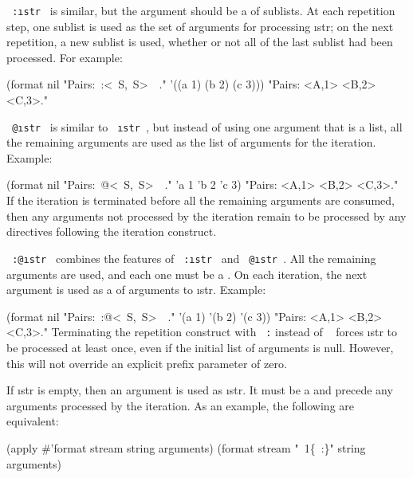 {\tt ~:\lbr \i{str}~\rbr  } is similar, 
but the argument should be a  of sublists.
At each repetition step, one sublist 
is used as the set of arguments for
processing \i{str}; on the next repetition, a new sublist 
is used, whether
or not all of the last sublist had been processed.  
For example:

                                                                               

\code
 (format nil "Pairs:~:\lbr <~S,~S>~\rbr\ ." 
                 '((a 1) (b 2) (c 3)))
\EV "Pairs: <A,1> <B,2> <C,3>."
\endcode

{\tt ~@\lbr \i{str}~\rbr }
is similar to {\tt ~\lbr \i{str}~\rbr  }, but instead of
using one argument that is a list, all the remaining arguments
are used as the list of arguments for the iteration.
Example:
                                    
\code
 (format nil "Pairs:~@\lbr <~S,~S>~\rbr\ ." 'a 1 'b 2 'c 3)
\EV "Pairs: <A,1> <B,2> <C,3>."
\endcode
If the iteration is terminated before all the remaining arguments are
consumed, then any arguments not processed by the iteration remain to be
processed by any directives following the iteration construct.

{\tt ~:@\lbr \i{str}~\rbr  } 
combines the features                              
of {\tt ~:\lbr \i{str}~\rbr  }
and {\tt ~@\lbr \i{str}~\rbr  }.
All the remaining arguments
are used, and each one must be a .
On each iteration, the next argument is 
used as a  of arguments to \i{str}.
Example:
                                     
\code
 (format nil "Pairs:~:@\lbr <~S,~S>~\rbr\ ." 
              '(a 1) '(b 2) '(c 3)) 
\EV "Pairs: <A,1> <B,2> <C,3>."
\endcode
Terminating the repetition construct with {\tt ~:\rbr } 
instead of {\tt ~\rbr  }
forces \i{str} to be processed at least once, even if the initial
list of arguments is null. However, this will not override an explicit
prefix parameter of zero.

If \i{str} is empty, then an argument is used as \i{str}.  
It must be a 
and precede any arguments processed by the iteration.  As an example,
the following are equivalent:

\code
 (apply #'format stream string arguments)
 (format stream "~1\{~:\}" string arguments)
\endcode

